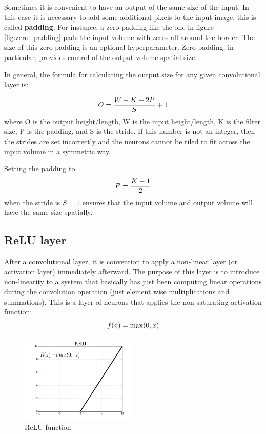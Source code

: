 Sometimes it is convenient to have an output of the same size of the input. In this case it is necessary to add some additional pixels to the input image, this is called \textbf{padding}. For instance, a zero padding like the one in figure \ref{fig:zero_padding} pads the input volume with zeros all around the border.
The size of this zero-padding is an optional hyperparameter. Zero padding, in particular, provides control of the output volume spatial size.

In general, the formula for calculating the output size for any given convolutional layer is:

\begin{equation} \notag
	O=\frac{W-K+2P}{S}+1
\end{equation}
where O is the output height/length, W is the input height/length, K is the filter size, P is the padding, and S is the stride. If this number is not an integer, then the strides are set incorrectly and the neurons cannot be tiled to fit across the input volume in a symmetric way.

Setting the padding to
\begin{equation} \notag
	P=\frac{K-1}{2}
\end{equation}
when the stride is $S=1$ ensures that the input volume and output volume will have the same size spatially.

\subsection{ReLU layer}

After a convolutional layer, it is convention to apply a non-linear layer (or activation layer) immediately afterward. The purpose of this layer is to introduce non-linearity to a system that basically has just been computing linear operations during the convolution operation (just element wise multiplications and summations). This is a layer of neurons that applies the non-saturating activation function:
\begin{equation} \notag
	f(x)=\max(0,x)
\end{equation}

\begin{figure}[!ht]
	\centering
	\includegraphics[width=0.5\textwidth]{Images/relu_function}
	\caption{\ac{ReLU} function}\label{fig:relu_function}
\end{figure}

